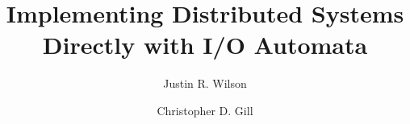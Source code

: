 \documentclass[letterpaper]{article}
\begin{document}
\title{Implementing Distributed Systems Directly with I/O Automata}
\author{Justin R. Wilson \and Christopher D. Gill}
\date{}

\maketitle
















\end{document}

